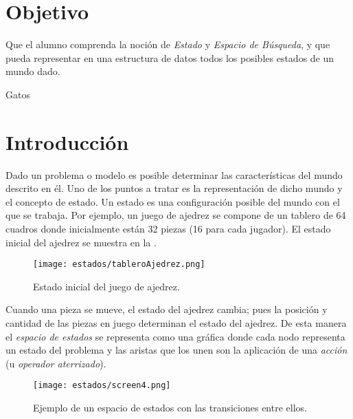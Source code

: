 

\section{Objetivo}
Que el alumno comprenda la noción de \emph{Estado} y \emph{Espacio de Búsqueda}, y que pueda representar en una estructura de datos todos los posibles estados de un mundo dado. \par

\begin{auxcode}
 \caption{Gatos}
 \centering
\end{auxcode}

\section{Introducci\'on}
Dado un problema o modelo es posible determinar las características del mundo descrito en él. Uno de los puntos a tratar es la representación de dicho mundo y el concepto de estado. Un estado es una configuración posible del mundo con el que se trabaja. Por ejemplo, un juego de ajedrez se compone de un tablero de 64 cuadros donde inicialmente están 32 piezas (16 para cada jugador). El estado inicial del ajedrez se muestra en la .\par

\begin{figure}
  \centering
  \texttt{[image: estados/tableroAjedrez.png]}
  \caption{Estado inicial del juego de ajedrez.}
  \label{fig:ajedrez}
\end{figure}

Cuando una pieza se mueve, el estado del ajedrez cambia; pues la posición y cantidad de las piezas en juego determinan el estado del ajedrez.  De esta manera el \emph{espacio de estados} se representa como una gráfica donde cada nodo representa un estado del problema y las aristas que los unen son la aplicación de una \emph{acción} (u \textit{operador aterrizado}).\par


\begin{figure}
  \centering
  \texttt{[image: estados/screen4.png]}
  \caption{Ejemplo de un espacio de estados con las transiciones entre ellos. \protect\footnotemark }
  \label{fig:espacioestados}
\end{figure}


